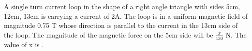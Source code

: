 \item A single turn current loop in the shape of a right angle triangle with sides 5cm, 12cm, 13cm is carrying a current of 2A. The loop is in a uniform magnetic field of magnitude 0.75 T whose direction is parallel to the current in the 13cm side of the loop. The magnitude of the magnetic force on the 5cm side will be $\frac{x}{130}$ N. The value of x is \underline{\hspace{2.5cm}}.